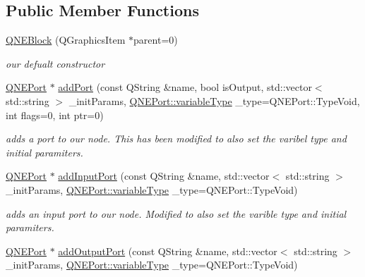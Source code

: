 \subsection*{Public Member Functions}
\begin{DoxyCompactItemize}
\item 
\hypertarget{class_q_n_e_block_af41dba36c55f97cf6f2556cf7daf138f}{\hyperlink{class_q_n_e_block_af41dba36c55f97cf6f2556cf7daf138f}{Q\-N\-E\-Block} (Q\-Graphics\-Item $\ast$parent=0)}\label{class_q_n_e_block_af41dba36c55f97cf6f2556cf7daf138f}

\begin{DoxyCompactList}\small\item\em our defualt constructor \end{DoxyCompactList}\item 
\hypertarget{class_q_n_e_block_a1e45a9b7f2ace3da607662a84af3388a}{\hyperlink{class_q_n_e_port}{Q\-N\-E\-Port} $\ast$ \hyperlink{class_q_n_e_block_a1e45a9b7f2ace3da607662a84af3388a}{add\-Port} (const Q\-String \&name, bool is\-Output, std\-::vector$<$ std\-::string $>$ \-\_\-init\-Params, \hyperlink{class_q_n_e_port_aeb3a8a2ac138252d1a0afc2c4f00438f}{Q\-N\-E\-Port\-::variable\-Type} \-\_\-type=Q\-N\-E\-Port\-::\-Type\-Void, int flags=0, int ptr=0)}\label{class_q_n_e_block_a1e45a9b7f2ace3da607662a84af3388a}

\begin{DoxyCompactList}\small\item\em adds a port to our node. This has been modified to also set the varibel type and initial paramiters. \end{DoxyCompactList}\item 
\hypertarget{class_q_n_e_block_a17510e88ed95706eea4adb6ce05c0b37}{\hyperlink{class_q_n_e_port}{Q\-N\-E\-Port} $\ast$ \hyperlink{class_q_n_e_block_a17510e88ed95706eea4adb6ce05c0b37}{add\-Input\-Port} (const Q\-String \&name, std\-::vector$<$ std\-::string $>$ \-\_\-init\-Params, \hyperlink{class_q_n_e_port_aeb3a8a2ac138252d1a0afc2c4f00438f}{Q\-N\-E\-Port\-::variable\-Type} \-\_\-type=Q\-N\-E\-Port\-::\-Type\-Void)}\label{class_q_n_e_block_a17510e88ed95706eea4adb6ce05c0b37}

\begin{DoxyCompactList}\small\item\em adds an input port to our node. Modified to also set the varible type and initial paramiters. \end{DoxyCompactList}\item 
\hypertarget{class_q_n_e_block_afb9d697f080d9bc14166304f6da91a59}{\hyperlink{class_q_n_e_port}{Q\-N\-E\-Port} $\ast$ \hyperlink{class_q_n_e_block_afb9d697f080d9bc14166304f6da91a59}{add\-Output\-Port} (const Q\-String \&name, std\-::vector$<$ std\-::string $>$ \-\_\-init\-Params, \hyperlink{class_q_n_e_port_aeb3a8a2ac138252d1a0afc2c4f00438f}{Q\-N\-E\-Port\-::variable\-Type} \-\_\-type=Q\-N\-E\-Port\-::\-Type\-Void)}\label{class_q_n_e_block_afb9d697f080d9bc14166304f6da91a59}


\end{DoxyCompactItemize}
